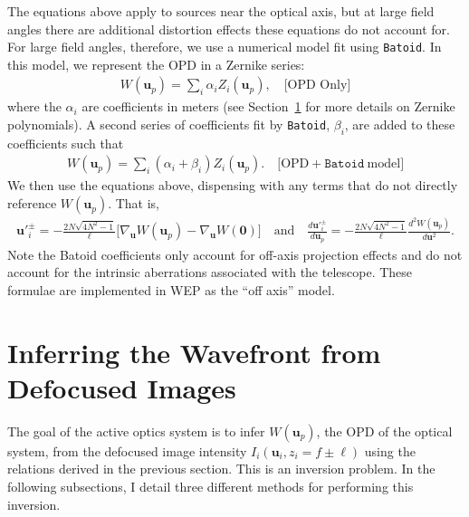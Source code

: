 \documentclass[TS,authoryear,toc]{lsstdoc}
\begin{document}
The equations above apply to sources near the optical axis, but at large field angles there are additional distortion effects these equations do not account for.
For large field angles, therefore, we use a numerical model fit using \texttt{Batoid}.
In this model, we represent the OPD in a Zernike series:
\begin{align}
  W(\mathbf{u}_p) = \sum_i \alpha_i Z_i(\mathbf{u}_p),
  \quad \big[ \text{OPD Only} \big]
\end{align}
where the $\alpha_i$ are coefficients in meters (see Section~\ref{sec:estimation} for more details on Zernike polynomials).
A second series of coefficients fit by \texttt{Batoid}, $\beta_i$, are added to these coefficients such that
\begin{align}
  W(\mathbf{u}_p) = \sum_i (\alpha_i + \beta_i) Z_i(\mathbf{u}_p).
  \quad \big[ \text{OPD} + \texttt{Batoid}~\text{model} \big]
\end{align}
We then use the equations above, dispensing with any terms that do not directly reference $W(\mathbf{u}_p)$.
That is, 
\begin{align}
  \mathbf{u'}_{\!i}^\pm = - \frac{2 N \sqrt{4 N^2 - 1}}{\ell} \Big[ \nabla_\mathbf{u} W(\mathbf{u}_p) - \nabla_\mathbf{u} W(\mathbf{0}) \Big]
  \quad \text{and} \quad
  \frac{d\mathbf{u'}_{\!i}^\pm}{d\mathbf{u}_p} = - \frac{2N \sqrt{4N^2 - 1}}{\ell} \frac{d^2 W(\mathbf{u}_p)}{d \mathbf{u}^2}.
\end{align}
Note the Batoid coefficients only account for off-axis projection effects and do not account for the intrinsic aberrations associated with the telescope.
These formulae are implemented in WEP as the ``off axis'' model.


\section{Inferring the Wavefront from Defocused Images}
\label{sec:estimation}

The goal of the active optics system is to infer $W(\mathbf{u}_p)$, the OPD of the optical system, from the defocused image intensity $I_i(\mathbf{u}_i, z_i = f \pm \ell)$ using the relations derived in the previous section.
This is an inversion problem.
In the following subsections, I detail three different methods for performing this inversion.
\end{document}
